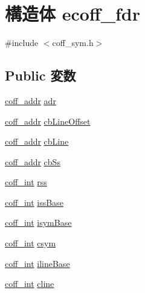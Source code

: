 \hypertarget{structecoff__fdr}{
\section{構造体 ecoff\_\-fdr}
\label{structecoff__fdr}
}


{\ttfamily \#include $<$coff\_\-sym.h$>$}\subsection*{Public 変数}
\begin{DoxyCompactItemize}
\item 
\hyperlink{ecoff__machdep_8h_a4fbfcee7b2a1d29c094364adc6423da0}{coff\_\-addr} \hyperlink{structecoff__fdr_aa107dae335462ef6611fd0f516d6a35a}{adr}
\item 
\hyperlink{ecoff__machdep_8h_a4fbfcee7b2a1d29c094364adc6423da0}{coff\_\-addr} \hyperlink{structecoff__fdr_a7332332a06749b52b7210069fc3f6179}{cbLineOffset}
\item 
\hyperlink{ecoff__machdep_8h_a4fbfcee7b2a1d29c094364adc6423da0}{coff\_\-addr} \hyperlink{structecoff__fdr_ab31c46c6e30ce51abc9e9ec2a3284563}{cbLine}
\item 
\hyperlink{ecoff__machdep_8h_a4fbfcee7b2a1d29c094364adc6423da0}{coff\_\-addr} \hyperlink{structecoff__fdr_a797047c54f89e5076244083755eff0af}{cbSs}
\item 
\hyperlink{ecoff__machdep_8h_a484fbe8ab04f62e9ac2341a8275f3c35}{coff\_\-int} \hyperlink{structecoff__fdr_a0c20f5c284acb09945a575da6c3b6fad}{rss}
\item 
\hyperlink{ecoff__machdep_8h_a484fbe8ab04f62e9ac2341a8275f3c35}{coff\_\-int} \hyperlink{structecoff__fdr_ae316ffb42ebf2ef4084de82b15982ff4}{issBase}
\item 
\hyperlink{ecoff__machdep_8h_a484fbe8ab04f62e9ac2341a8275f3c35}{coff\_\-int} \hyperlink{structecoff__fdr_a235899eb0ac6804211338058e263b095}{isymBase}
\item 
\hyperlink{ecoff__machdep_8h_a484fbe8ab04f62e9ac2341a8275f3c35}{coff\_\-int} \hyperlink{structecoff__fdr_a054238ccd5c0da602ead91972c40fc82}{csym}
\item 
\hyperlink{ecoff__machdep_8h_a484fbe8ab04f62e9ac2341a8275f3c35}{coff\_\-int} \hyperlink{structecoff__fdr_aa3a898a1d3aa1852801234dfc31b4c65}{ilineBase}
\item 
\hyperlink{ecoff__machdep_8h_a484fbe8ab04f62e9ac2341a8275f3c35}{coff\_\-int} \hyperlink{structecoff__fdr_a84661526f6caef2444deb40802450096}{cline}
\item 

\end{DoxyCompactItemize}

